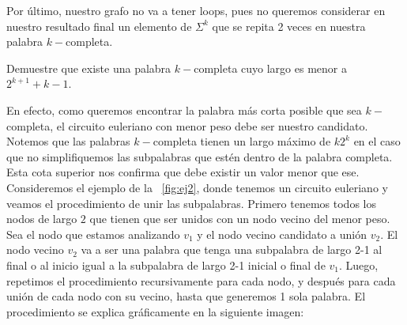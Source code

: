\documentclass[letterpaper,10pt,table, dvipsnames]{article}
\newcommand{\figref}[1]{\figurename~\ref{#1}}
\begin{document}
Por último, nuestro grafo no va a tener loops, pues no queremos considerar en nuestro resultado final un elemento de $\Sigma^k$ que se repita 2 veces en nuestra palabra $k-$completa.

\newpage

\begin{tcolorbox}
 Demuestre que existe una palabra $k-$completa cuyo largo es menor a $2^{k+1} + k - 1$.
\end{tcolorbox}
 
En efecto, como queremos encontrar la palabra más corta posible que sea $k-$completa, el circuito euleriano con menor peso debe ser nuestro candidato. Notemos que las palabras $k-$completa tienen un largo máximo de $k2^k$ en el caso que no simplifiquemos las subpalabras que estén dentro de la palabra completa. Esta cota superior nos confirma que debe existir un valor menor que ese. \\

Consideremos el ejemplo de la \figref{fig:ej2}, donde tenemos un circuito euleriano y veamos el procedimiento de unir las subpalabras. Primero tenemos todos los nodos de largo $2$ que tienen que ser unidos con un nodo vecino del menor peso. Sea el nodo que estamos analizando $v_1$ y el nodo vecino candidato a unión $v_2$. El nodo vecino $v_2$ va a ser una palabra que tenga una subpalabra de largo 2-1 al final o al inicio igual a la subpalabra de largo 2-1 inicial o final de $v_1$. Luego, repetimos el procedimiento recursivamente para cada nodo, y después para cada unión de cada nodo con su vecino, hasta que generemos 1 sola palabra. El procedimiento se explica gráficamente en la siguiente imagen:
\end{document}
